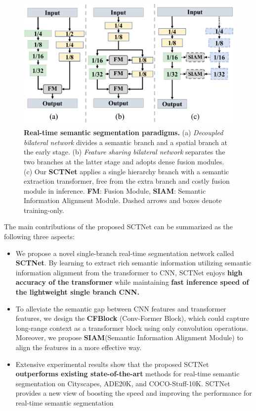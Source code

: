 \documentclass[letterpaper]{article} %
\begin{document}
\begin{figure}
  \begin{center}
     \includegraphics[width=\linewidth]{image/figure2_comparsion.pdf}
  \setlength{\belowdisplayskip}{-10pt}
  \end{center}
  \vspace{-10pt}
     \caption{\textbf{Real-time semantic segmentation paradigms.} (a) \emph{Decoupled bilateral network} divides a semantic branch and a spatial branch at the early stage. (b) \emph{Feature sharing bilateral network} separates the two branches at the latter stage and adopts dense fusion modules. (c) Our \textbf{SCTNet} applies a single hierarchy branch with a semantic extraction transformer, free from the extra branch and costly fusion module in inference. \textbf{FM}: Fusion Module,  \textbf{SIAM}: Semantic Information Alignment Module. Dashed arrows and boxes denote training-only. }
  \label{fig:figure2_comparsion}
  \vspace{-10pt}
  \end{figure}

The main contributions of the proposed SCTNet can be summarized as the following three aspects:
\begin{itemize}
    \item We propose a novel single-branch real-time segmentation network called \textbf{SCTNet}. By learning to extract rich semantic information utilizing semantic information alignment from the transformer to CNN, SCTNet enjoys \textbf{high accuracy of the transformer} while maintaining \textbf{fast inference speed of the lightweight single branch CNN.}
    \item To alleviate the semantic gap between CNN features and transformer features, we design the \textbf{CFBlock} (Conv-Former Block), which could capture long-range context as a transformer block using only convolution operations. Moreover, we propose \textbf{SIAM}(Semantic Information Alignment Module) to align the features in a more effective way.
    \item Extensive experimental results show that the proposed SCTNet \textbf{outperforms existing state-of-the-art} methods for real-time semantic segmentation on Cityscapes, ADE20K, and COCO-Stuff-10K. SCTNet provides a new view of boosting the speed and improving the performance for real-time semantic segmentation
\end{itemize}
\end{document}
